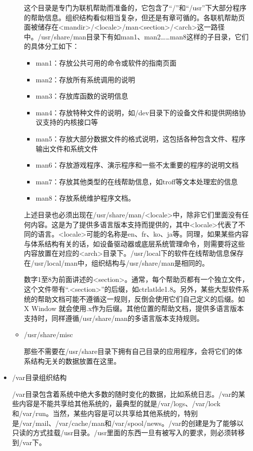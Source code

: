 \begin{itemize}
\begin{itemize}
	\qquad 这个目录是专门为联机帮助而准备的，它包含了“/”和“/usr”下大部分程序的帮助信息。组织结构看似相当复杂，但还是有章可循的。各联机帮助页面被储存在<mandir>/<locale>/man<section>/<arch>这一路径中。/usr/share/man目录下有如man1、man2……man8这样的子目录，它们的具体分工如下：
		\begin{itemize}
		\item man1：存放公共可用的命令或软件的指南页面
		\item man2：存放所有系统调用的说明
		\item man3：存放库函数的说明信息
		\item man4：存放特种文件的说明，如/dev目录下的设备文件和提供网络协议支持的内核接口等
		\item man5：存放大部分数据文件的格式说明，这包括各种包含文件、程序输出文件和系统文件
		\item man6：存放游戏程序、演示程序和一些不太重要的程序的说明文档
		\item man7：存放其他类型的在线帮助信息，如troff等文本处理宏的信息
		\item man8：存放系统维护程序文档。
		\end{itemize}
	上述目录也必须出现在/usr/share/man/<locale>中，除非它们里面没有任何内容。这是为了提供多语言版本支持而提供的，其中<locale>代表了不同的语言。<locale>可能的名称是en、fr、ko、ja等。同理，如果某些内容与体系结构有关的话，如设备驱动器或底层系统管理命令，则需要将这些内容放置在对应的<arch>目录下。/usr/local下的软件在线帮助信息保存在/usr/local/man中，组织结构与/usr/share/man是相同的。
	
	\qquad 数字1至8为前面讲述的<section>。通常，每个帮助页都有一个独立文件，这个文件带有“.<section>”的后缀，如ctrlatlde1.8。另外，某些大型软件系统的帮助文档可能不遵循这一规则，反倒会使用它们自己定义的后缀。如 X Window 就会使用.x作为后缀。其他位置的帮助文档，提供多语言版本支持时，同样遵循/usr/share/man的多语言版本支持规则。
	
	\item /usr/share/misc
	
	\qquad 那些不需要在/usr/share目录下拥有自己目录的应用程序，会将它们的体系结构无关的数据放置在这里。
	\end{itemize}
	
\item /var目录组织结构

\qquad /var目录包含着系统中绝大多数的随时变化的数据，比如系统日志。/var的某些内容是不能共享给其他系统的，最典型的就是/var/logs、/var/lock和/var/run。当然，某些内容是可以共享给其他系统的，特别是/var/mail、/var/cache/man和/var/spool/news。/var的创建是为了能够以只读的方式挂载/usr目录。/usr里面的东西一旦有被写入的要求，则必须转移到/var下。


\end{itemize}
